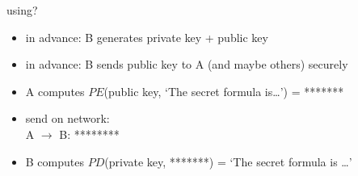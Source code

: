 \begin{frame}{using?}
    \begin{itemize}
    \item in advance: B generates private key + public key
    \item in advance: B sends public key to A (and maybe others) securely
    \vspace{.5cm}
    \item A computes $PE$(public key, `The secret formula is\ldots') = *******
    \item send on network: \\
    A $\rightarrow$ B: ********
    \item B computes $PD$(private key, *******) = `The secret formula is \ldots'
    \end{itemize}
\end{frame}
